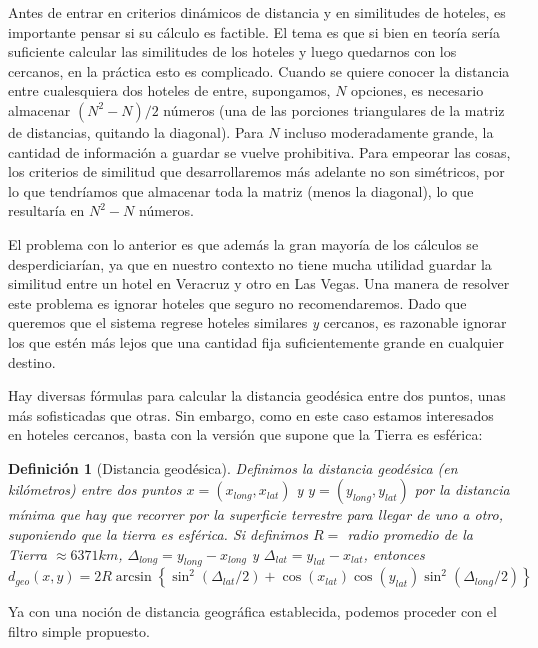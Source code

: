 \documentclass[12pt]{report}
\newtheorem{defn}{Definici\'on}[chapter]
\begin{document}
Antes de entrar en criterios dinámicos de distancia y en similitudes de hoteles, es importante pensar si su cálculo es factible. El tema es que si bien en teoría sería suficiente calcular las similitudes de los hoteles y luego quedarnos con los cercanos, en la práctica esto es complicado. Cuando se quiere conocer la distancia entre cualesquiera dos hoteles de entre, supongamos, $N$ opciones, es necesario almacenar $(N^2 - N)/2$ números (una de las porciones triangulares de la matriz de distancias, quitando la diagonal). Para $N$ incluso moderadamente grande, la cantidad de información a guardar se vuelve prohibitiva. Para empeorar las cosas, los criterios de similitud que desarrollaremos más adelante no son simétricos, por lo que tendríamos que almacenar toda la matriz (menos la diagonal), lo que resultaría en $N^2 - N$ números.

El problema con lo anterior es que además la gran mayoría de los cálculos se desperdiciarían, ya que en nuestro contexto no tiene mucha utilidad guardar la similitud entre un hotel en Veracruz y otro en Las Vegas. Una manera de resolver este problema es ignorar hoteles que seguro no recomendaremos. Dado que queremos que el sistema regrese hoteles similares \emph{y} cercanos, es razonable ignorar los que estén más lejos que una cantidad fija suficientemente grande en cualquier destino.

Hay diversas fórmulas para calcular la distancia geodésica entre dos puntos, unas más sofisticadas que otras. Sin embargo, como en este caso estamos interesados en hoteles cercanos, basta con la versión que supone que la Tierra es esférica:
\begin{defn}[Distancia geodésica]
Definimos la distancia geodésica (en kilómetros) entre dos puntos $x = (x_{long}, x_{lat})$ y $y = (y_{long}, y_{lat})$ por la distancia mínima que hay que recorrer por la superficie terrestre para llegar de uno a otro, suponiendo que la tierra es esférica. Si definimos $R =$ radio promedio de la Tierra $\approx 6371 km$, $\Delta_{long} = y_{long} - x_{long}$ y $\Delta_{lat} = y_{lat} - x_{lat}$, entonces
\[
d_{geo}(x,y) = 2 R \arcsin\left\{\sin^2(\Delta_{lat}/2) + \cos(x_{lat}) \cos(y_{lat}) \sin^2(\Delta_{long}/2) \right\}
\]
\end{defn}

Ya con una noción de distancia geográfica establecida, podemos proceder con el filtro simple propuesto.
\end{document}
